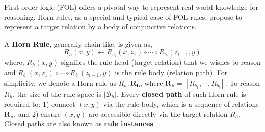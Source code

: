 



First-order logic (FOL) offers a pivotal way to represent real-world knowledge for reasoning. Horn rules, as a special and typical case of FOL rules, propose to represent a target relation by a body of conjunctive relations.

\begin{definitionnew}
\label{def:horn_rule}
A \textbf{Horn Rule}, generally chain-like, is given as,
\begin{equation*}
    R_h(x,y) \leftarrow R_{b_1}(x,z_1) \circ \cdots \circ R_{b_l}(z_{l-1},y)
\end{equation*}
where, $R_h(x,y)$ signifies the rule head (target relation) that we wishes to reason and $R_{b_1}(x,z_1) \circ \cdots \circ R_{b_l}(z_{l-1},y)$ is the rule body (relation path). For simplicity, we denote a Horn rule as $R_h:\mathbf{R_b}$, where $\mathbf{R_b}=[R_{b_1}, \cdots, R_{b_l}]$. To reason $R_h$, the size of the rule space is $|\mathcal{B}_h|$.
Every \textbf{closed path} of such Horn rule is required to: 1) connect $(x,y)$ via the rule body, which is a sequence of relations $\mathbf{R_b}$, and 2) ensure $(x,y)$ are accessible directly via the target relation $R_h$. Closed paths are also known as \textbf{rule instances}.
\end{definitionnew}

